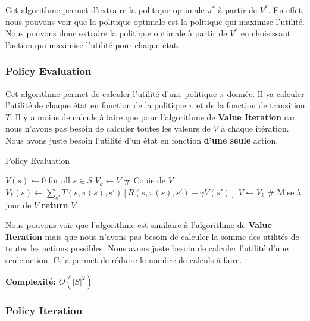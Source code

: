 Cet algorithme permet d'extraire la politique optimale $\pi^*$ à partir de $V^*$. 
En effet, nous pouvons voir que la politique optimale est la politique qui maximise l'utilité. 
Nous pouvons donc extraire la politique optimale à partir de $V^*$ en choisissant l'action qui maximise l'utilité pour chaque état.


\subsubsection{Policy Evaluation} %
\label{sec:policy_evaluation}

Cet algorithme permet de calculer l'utilité d'une politique $\pi$ donnée. 
Il va calculer l'utilité de chaque état en fonction de la politique $\pi$ et de la fonction de transition $T$. 
Il y a moins de calculs à faire que pour l'algorithme de \textbf{Value Iteration} car nous n'avons pas besoin de calculer toutes les valeurs de $V$ à chaque itération. 
Nous avons juste besoin l'utilité d'un état en fonction \textbf{d'une seule} action.

\begin{algorithm}[H]
    \caption{Policy Evaluation}\label{alg:policyevaluation}
    \begin{algorithmic}[1]
            \State $V(s) \gets 0$ for all $s \in S$
            \Repeat
                \State $V_k \gets V$ # Copie de $V$
                    \State $V_k(s) \gets \sum_{s'} T(s, \pi(s), s') \left[ R(s, \pi(s), s') + \gamma V(s') \right]$
                \EndFor
                \State $V \gets V_k$ # Mise à jour de $V$
            \State \textbf{return} $V$
        \EndProcedure
    \end{algorithmic} 
\end{algorithm}

Nous pouvons voir que l'algorithme est similaire à l'algorithme de \textbf{Value Iteration} mais que nous n'avons pas besoin de calculer 
la somme des utilités de toutes les actions possibles. Nous avons juste besoin de calculer l'utilité d'une seule action. 
Cela permet de réduire le nombre de calculs à faire.

\textbf{Complexité:} $O(|S|^2)$

\subsubsection{Policy Iteration} %
\label{sec:policy_iteration}

